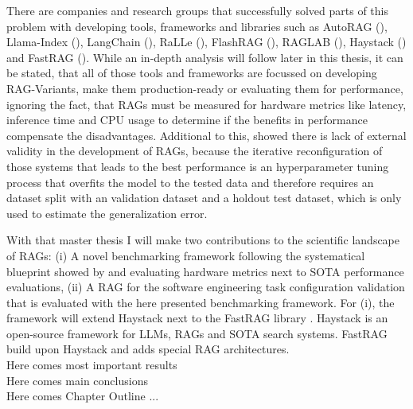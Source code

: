 There are companies and research groups that successfully solved parts of this problem with developing tools, frameworks and libraries such as AutoRAG (\citeyear{AutoRAG}), Llama-Index (\citeyear{Liu_LlamaIndex_2022}), LangChain (\citeyear{Chase_LangChain_2022}), RaLLe (\citeyear{ralle}), FlashRAG (\citeyear{FlashRAG}), RAGLAB (\citeyear{zhang-etal-2024-raglab}), Haystack (\citeyear{Pietsch_Haystack_the_end-to-end_2019}) and FastRAG (\citeyear{Izsak_fastRAG_Efficient_Retrieval_2023}). While an in-depth analysis will follow later in this thesis, it can be stated, that all of those tools and frameworks are focussed on developing RAG-Variants, make them production-ready or evaluating them for performance, ignoring the fact, that RAGs must be measured for hardware metrics like latency, inference time and CPU usage to determine if the benefits in performance compensate the disadvantages. Additional to this, \citet{Simon.10112024} showed there is lack of external validity in the development of RAGs, because the iterative reconfiguration of those systems that leads to the best performance is an hyperparameter tuning process that overfits the model to the tested data and therefore requires an dataset split with an validation dataset and a holdout test dataset, which is only used to estimate the generalization error.

With that master thesis I will make two contributions to the scientific landscape of RAGs: (i) A novel benchmarking framework following the systematical blueprint showed by \citet{Simon.10112024} and evaluating hardware metrics next to SOTA performance evaluations, (ii) A RAG for the software engineering task configuration validation that is evaluated with the here presented benchmarking framework. For (i), the framework will extend Haystack \citeyear{Pietsch_Haystack_the_end-to-end_2019} next to the FastRAG library \citeyear{Izsak_fastRAG_Efficient_Retrieval_2023}. Haystack is an open-source framework for LLMs, RAGs and SOTA search systems. FastRAG build upon Haystack and adds special RAG architectures. \\


\large Here comes most important results \\
\large Here comes main conclusions \\
\large Here comes Chapter Outline ...\\
